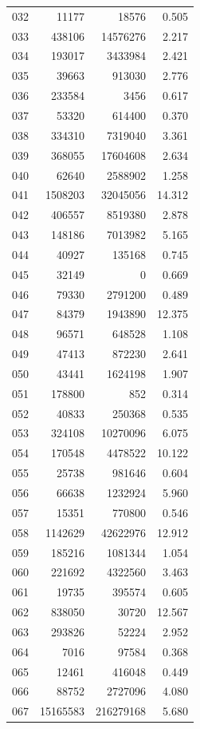 \documentclass[anonymous,notoc]{gmcm2026}
\begin{document}
\begin{longtable}{lrrr}
032 & 11177 & 18576 & 0.505 \\
033 & 438106 & 14576276 & 2.217 \\
034 & 193017 & 3433984 & 2.421 \\
035 & 39663 & 913030 & 2.776 \\
036 & 233584 & 3456 & 0.617 \\
037 & 53320 & 614400 & 0.370 \\
038 & 334310 & 7319040 & 3.361 \\
039 & 368055 & 17604608 & 2.634 \\
040 & 62640 & 2588902 & 1.258 \\
041 & 1508203 & 32045056 & 14.312 \\
042 & 406557 & 8519380 & 2.878 \\
043 & 148186 & 7013982 & 5.165 \\
044 & 40927 & 135168 & 0.745 \\
045 & 32149 & 0 & 0.669 \\
046 & 79330 & 2791200 & 0.489 \\
047 & 84379 & 1943890 & 12.375 \\
048 & 96571 & 648528 & 1.108 \\
049 & 47413 & 872230 & 2.641 \\
050 & 43441 & 1624198 & 1.907 \\
051 & 178800 & 852 & 0.314 \\
052 & 40833 & 250368 & 0.535 \\
053 & 324108 & 10270096 & 6.075 \\
054 & 170548 & 4478522 & 10.122 \\
055 & 25738 & 981646 & 0.604 \\
056 & 66638 & 1232924 & 5.960 \\
057 & 15351 & 770800 & 0.546 \\
058 & 1142629 & 42622976 & 12.912 \\
059 & 185216 & 1081344 & 1.054 \\
060 & 221692 & 4322560 & 3.463 \\
061 & 19735 & 395574 & 0.605 \\
062 & 838050 & 30720 & 12.567 \\
063 & 293826 & 52224 & 2.952 \\
064 & 7016 & 97584 & 0.368 \\
065 & 12461 & 416048 & 0.449 \\
066 & 88752 & 2727096 & 4.080 \\
067 & 15165583 & 216279168 & 5.680 \\

\end{longtable}
\end{document}
